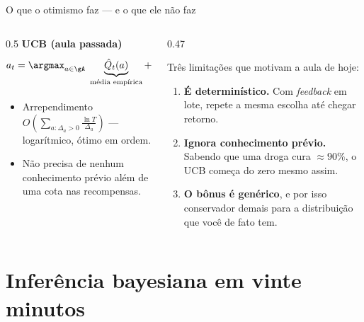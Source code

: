 \documentclass[aspectratio=169, 11pt]{beamer}
\begin{document}
\begin{frame}{O que o otimismo faz — e o que ele não faz}
  \begin{columns}[T]
    \begin{column}{0.5\textwidth}
      {\small\textbf{UCB (aula passada)}}
      \[
        a_t = \argmax_{a \in \gA}\;
          \underbrace{\hat{Q}_t(a)}_{\text{média empírica}}
          + \underbrace{\sqrt{\tfrac{2\ln t}{N_t(a)}}}_{\text{bônus de incerteza}}
      \]
      \begin{itemize}\setlength{\itemsep}{0.2ex}
        \item Arrependimento $O\!\left(\sum_{a:\Delta_a>0}
              \frac{\ln T}{\Delta_a}\right)$ — logarítmico, ótimo em ordem.
        \item Não precisa de nenhum conhecimento prévio além de uma cota
              nas recompensas.
      \end{itemize}
    \end{column}
    \begin{column}{0.47\textwidth}
      \begin{alertabox}
        Três limitações que motivam a aula de hoje:
        \begin{enumerate}\setlength{\itemsep}{0.2ex}
          \item \textbf{É determinístico.} Com \emph{feedback} em lote,
                repete a mesma escolha até chegar retorno.
          \item \textbf{Ignora conhecimento prévio.} Sabendo que uma droga
                cura $\approx 90\%$, o UCB começa do zero mesmo assim.
          \item \textbf{O bônus é genérico}, e por isso conservador demais
                para a distribuição que você de fato tem.
        \end{enumerate}
      \end{alertabox}
    \end{column}
  \end{columns}
\end{frame}

\section{Inferência bayesiana em vinte minutos}
\end{document}
